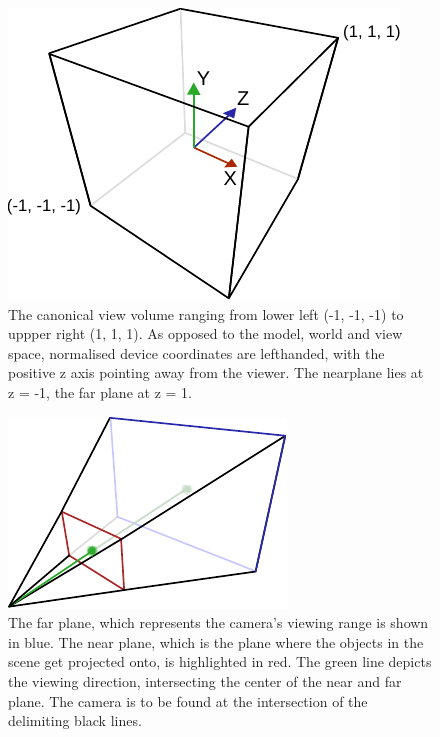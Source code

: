 \begin{figure}
\begin{center}
\includegraphics[scale=0.8]{Images/CanonicalCube.pdf}
\caption{The canonical view volume ranging from lower left (-1, -1, -1) to
uppper right (1, 1, 1). As opposed to the model, world and view space,
normalised device coordinates are lefthanded, with the positive z axis
pointing away from the viewer. The nearplane lies at z = -1, the far plane at z
= 1.}
\label{fig:canonicalviewvolume}
\end{center}
\end{figure}

\begin{figure}
\begin{center}
 \includegraphics[scale=1.0]{Images/Frustum.pdf}
 \caption{The far plane, which represents the camera's viewing range is shown
in blue. The near plane, which is the plane where the objects in the scene get
projected onto, is highlighted in red. The green line depicts the viewing
direction, intersecting the center of the near and far plane. The camera is to
be found at the intersection of the delimiting black lines.}
 \label{fig:viewfrustum3d}
\end{center} 
\end{figure}

